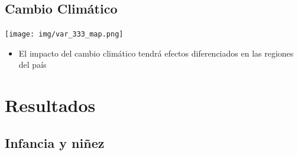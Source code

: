 \documentclass[aspectratio=169]{beamer}
\begin{document}
    \subsection{Cambio Climático}
    
    \begin{slide}{11} 
                      \begin{imagecolumn}
                \texttt{[image: img/var\_333\_map.png]}
            \end{imagecolumn}
            \begin{textcolumn}
                \begin{itemize}
                    \item El impacto del cambio climático tendrá efectos diferenciados en las regiones del país
                \end{itemize}
            \end{textcolumn}

    \printcolumns
    \end{slide}
    
    
     \section{Resultados}
    
    \subsection{Infancia y niñez}
    
\end{document}
